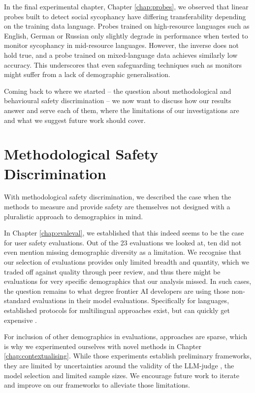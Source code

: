 In the final experimental chapter, Chapter \ref{chap:probes}, we observed that linear probes built to detect social sycophancy \cite{cheng2025social-928} have differing transferability depending on the training data language. Probes trained on high-resource languages such as English, German or Russian only slightly degrade in performance when tested to monitor sycophancy in mid-resource languages. However, the inverse does not hold true, and a probe trained on mixed-language data achieves similarly low accuracy. This underscores that even safeguarding techniques such as monitors might suffer from a lack of demographic generalisation.

Coming back to where we started – the question about methodological and behavioural safety discrimination – we now want to discuss how our results answer and serve each of them, where the limitations of our investigations are and what we suggest future work should cover.

\section{Methodological Safety Discrimination}
With methodological safety discrimination, we described the case when the methods to measure and provide safety are themselves not designed with a pluralistic approach \cite{sorensen2024roadmap} to demographics in mind.

In Chapter \ref{chap:evaleval}, we established that this indeed seems to be the case for user safety evaluations. Out of the 23 evaluations we looked at, ten did not even mention missing demographic diversity as a limitation. We recognise that our selection of evaluations provides only limited breadth and quantity, which we traded off against quality through peer review, and thus there might be evaluations for very specific demographics that our analysis missed. In such cases, the question remains to what degree frontier AI developers are using those non-standard evaluations in their model evaluations.
Specifically for languages, established protocols for multilingual approaches exist, but can quickly get expensive \cite{ahuja2023mega-415, xuan2025mmlu-prox-307}.

For inclusion of other demographics in evaluations, approaches are sparse, which is why we experimented ourselves with novel methods in Chapter \ref{chap:contextualising}. While those experiments establish preliminary frameworks, they are limited by uncertainties around the validity of the LLM-judge \cite{gu2025surveyllmasajudge, schroeder2025trustllmjudgmentsreliability}, the model selection and limited sample sizes. We encourage future work to iterate and improve on our frameworks to alleviate those limitations.

